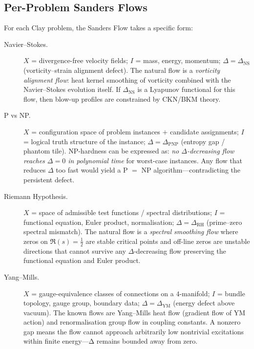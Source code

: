 \documentclass[12pt, openany]{book}
\theoremstyle{remark}
\begin{document}
\subsection{Per-Problem Sanders Flows}
\label{sec:per-problem-flows}

For each Clay problem, the Sanders Flow takes a specific form:

\begin{description}

\item[Navier--Stokes.]
$X$ = divergence-free velocity fields; $I$ = mass, energy, momentum;
$\Delta = \Delta_{\mathrm{NS}}$ (vorticity--strain alignment defect).
The natural flow is a \emph{vorticity alignment flow}: heat kernel smoothing of
vorticity combined with the Navier--Stokes evolution itself.  If $\Delta_{\mathrm{NS}}$
is a Lyapunov functional for this flow, then blow-up profiles are constrained by
CKN/BKM theory.

\item[P vs NP.]
$X$ = configuration space of problem instances $+$ candidate assignments;
$I$ = logical truth structure of the instance;
$\Delta = \Delta_{\mathrm{PNP}}$ (entropy gap / phantom tile).
NP-hardness can be expressed as: \emph{no $\Delta$-decreasing flow reaches
$\Delta = 0$ in polynomial time} for worst-case instances.  Any flow that reduces
$\Delta$ too fast would yield a P $=$ NP algorithm---contradicting the persistent
defect.

\item[Riemann Hypothesis.]
$X$ = space of admissible test functions / spectral distributions;
$I$ = functional equation, Euler product, normalisation;
$\Delta = \Delta_{\mathrm{RH}}$ (prime--zero spectral mismatch).
The natural flow is a \emph{spectral smoothing flow} where zeros on $\Re(s) = \tfrac{1}{2}$
are stable critical points and off-line zeros are unstable directions that cannot survive
any $\Delta$-decreasing flow preserving the functional equation and Euler product.

\item[Yang--Mills.]
$X$ = gauge-equivalence classes of connections on a 4-manifold;
$I$ = bundle topology, gauge group, boundary data;
$\Delta = \Delta_{\mathrm{YM}}$ (energy defect above vacuum).
The known flows are Yang--Mills heat flow (gradient flow of YM action) and
renormalisation group flow in coupling constants.  A nonzero gap means the flow
cannot approach arbitrarily low nontrivial excitations within finite energy---Δ
remains bounded away from zero.


\end{description}
\end{document}
